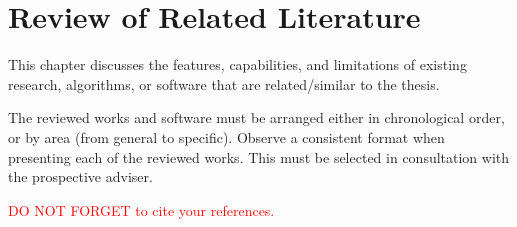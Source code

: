 %
%
%                 

\chapter{Review of Related Literature}
\label{sec:relatedlit}

This chapter discusses the features, capabilities, and limitations of existing research, algorithms, or software 
that are related/similar to the thesis.

 The reviewed works and software must be arranged either in chronological order, or by area (from general to specific).  
Observe a consistent format when presenting each of the reviewed works. This must be selected in consultation with the prospective adviser.

\textcolor{red}{DO NOT FORGET to cite your references.}


\begin{comment}
%
%
Guide on Writing your RRL chapter
 
1. Identify the keywords with respect to your research
      One keyword = One document section
                Examples: 2.1 Story Generation Systems
			 2.2 Knowledge Representation

2.  Find references using these keywords

3.  For each of the references that you find,
        Check: Is it relevant to your research?
        Use their references to find more relevant works.

4. Identify a set of criteria for comparison.
       It will serve as a guide to help you focus on what to look for

5. Write a summary focusing on -
       What: A short description of the work
       How: A summary of the approach it utilized
       Findings: If applicable, provide the results
        Why: Relevance to your work

6. At the end of each section,  show a Table of Comparison of the related works 
   and your proposed project/system

\end{comment}


